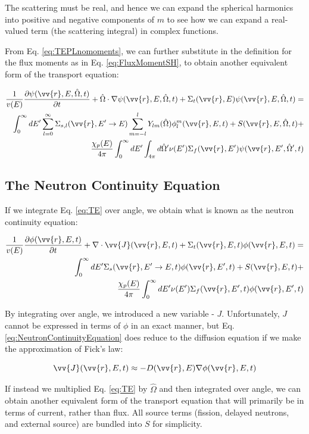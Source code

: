 \documentclass[10pt]{article}
\newcommand{\beq}{\begin{equation}}
\newcommand{\eeq}{\end{equation}}
\newcommand{\beqa}{\begin{equation}\begin{aligned}}
\newcommand{\eeqa}{\end{aligned}\end{equation}}
\newcommand{\hO}{\hat{\Omega}}
\newcommand{\spa}{(\vv{r}, E, \hO, t)}
\newcommand{\spas}{(\vv{r},E,t)}
\newcommand{\spap}{(\vv{r}, E', \hO',t)}
\begin{document}
\begin{flushleft}
The scattering must be real, and hence we can expand the spherical harmonics into positive and negative components of \(m\) to see how we can expand a real-valued term (the scattering integral) in complex functions. 

From Eq. \eqref{eq:TEPLnomoments}, we can further substitute in the definition for the flux moments as in Eq. \ref{eq:FluxMomentSH},  to obtain another equivalent form of the transport equation:

\begin{equation}
\label{eq:TEPL}
\begin{aligned}
\frac{1}{v(E)} \frac{\partial\psi\spa }{\partial t} +
 \hO  \cdot\nabla\psi\spa  + 
 \Sigma_t(\vv{r},E)\psi\spa  = \\
 \int_{0}^{\infty}dE' \sum_{l=0}^{\infty} \Sigma_{s,l}(\vv{r}, E'\rightarrow E) \sum_{m=-l}^{l} Y_{lm}(\hO  )\phi_l^m\spas + S\spa +\\
\frac{\chi_p(E)}{4\pi} \int_{0}^{\infty} dE'\int_{4\pi}^{} d\hO  '\nu(E')\Sigma_f(\vv{r}, E')\psi\spap\\
\end{aligned}
\end{equation}

\subsection{The Neutron Continuity Equation}
If we integrate Eq. \ref{eq:TE} over angle, we obtain what is known as the neutron continuity equation:

\beqa
\label{eq:NeutronContinuityEquation}
\frac{1}{v(E)} \frac{\partial\phi\spas}{\partial t} +
 \nabla\cdot \vv{J}\spas + 
 \Sigma_t\spas\phi\spas = \\
 \int_{0}^{\infty}dE' \Sigma_s(\vv{r}, E'\rightarrow E,t)\phi(\vv{r}, E', t) + S\spas+\\
 \frac{\chi_p(E)}{4\pi} \int_{0}^{\infty} dE'\nu(E')\Sigma_f(\vv{r}, E',t)\phi(\vv{r}, E',t)
\eeqa

By integrating over angle, we introduced a new variable - \(J\). Unfortunately, \(J\) cannot be expressed in terms of \(\phi\) in an exact manner, but Eq. \ref{eq:NeutronContinuityEquation} does reduce to the diffusion equation if we make the approximation of Fick's law:

\beq
\vv{J}\spas\approx-D(\vv{r},E)\nabla\phi\spas
\eeq

If instead we multiplied Eq. \ref{eq:TE} by \(\hO\) and then integrated over angle, we can obtain another equivalent form of the transport equation that will primarily be in terms of current, rather than flux. All source terms (fission, delayed neutrons, and external source) are bundled into \(S\) for simplicity. 


\end{flushleft}
\end{document}
